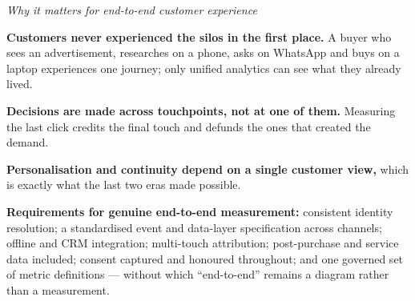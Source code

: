 \begin{qlist}
\textit{Why it matters for end-to-end customer experience}
\begin{apts}\setcounter{enumi}{6}
\item \textbf{Customers never experienced the silos in the first place.} A buyer
      who sees an advertisement, researches on a phone, asks on WhatsApp and
      buys on a laptop experiences one journey; only unified analytics can see
      what they already lived.
\item \textbf{Decisions are made across touchpoints, not at one of them.}
      Measuring the last click credits the final touch and defunds the ones that
      created the demand.
\item \textbf{Personalisation and continuity depend on a single customer view,}
      which is exactly what the last two eras made possible.
\item \textbf{Requirements for genuine end-to-end measurement:} consistent
      identity resolution; a standardised event and data-layer specification
      across channels; offline and CRM integration; multi-touch attribution;
      post-purchase and service data included; consent captured and honoured
      throughout; and one governed set of metric definitions --- without which
      ``end-to-end'' remains a diagram rather than a measurement.
\end{apts}


\end{qlist}
